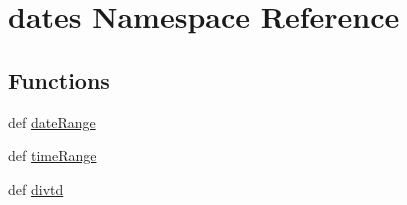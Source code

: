 \hypertarget{namespacedates}{\section{dates Namespace Reference}
\label{namespacedates}
}
\subsection*{Functions}
\begin{DoxyCompactItemize}
\item 
def \hyperlink{namespacedates_aff4b32f9982cb8076bdda15f79b4e4fa}{date\-Range}
\item 
def \hyperlink{namespacedates_a53f2c575dcabcf14b831ac51fdc68389}{time\-Range}
\item 
def \hyperlink{namespacedates_ac7ed19870ae2f9de44532f96670ba7e0}{divtd}
\end{DoxyCompactItemize}

